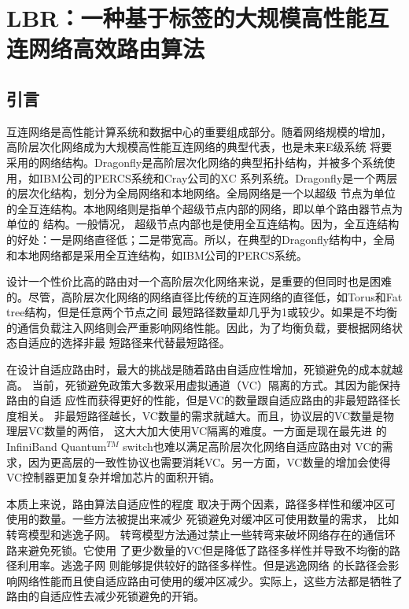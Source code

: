 \chapter{LBR：一种基于标签的大规模高性能互连网络高效路由算法}

\section{引言}

互连网络是高性能计算系统和数据中心的重要组成部分。随着网络规模的增加，
高阶层次化网络成为大规模高性能互连网络的典型代表，也是未来E级系统
将要采用的网络结构。Dragonfly是高阶层次化网络的典型拓扑结构，并被多个系统使用，如IBM公司的PERCS系统和Cray公司的XC 系列系统。Dragonfly是一个两层的层次化结构，划分为全局网络和本地网络。全局网络是一个以超级
节点为单位的全互连结构。本地网络则是指单个超级节点内部的网络，即以单个路由器节点为单位的
结构。一般情况，
超级节点内部也是使用全互连结构。因为，全互连结构的好处：一是网络直径低；二是带宽高。所以，在典型的Dragonfly结构中，全局
和本地网络都是采用全互连结构，如IBM公司的PERCS系统。

设计一个性价比高的路由对一个高阶层次化网络来说，是重要的但同时也是困难
的。尽管，高阶层次化网络的网络直径比传统的互连网络的直径低，如Torus和Fat tree结构，但是任意两个节点之间
最短路径数量却几乎为1或较少。如果是不均衡的通信负载注入网络则会严重影响网络性能。因此，为了均衡负载，要根据网络状态自适应的选择非最
短路径来代替最短路径。

在设计自适应路由时，最大的挑战是随着路由自适应性增加，死锁避免的成本就越高。
当前，死锁避免政策大多数采用虚拟通道（VC）隔离的方式。其因为能保持路由的自适
应性而获得更好的性能，但是VC的数量跟自适应路由的非最短路径长度相关。
非最短路径越长，VC数量的需求就越大。而且，协议层的VC数量是物理层VC数量的两倍，
这大大加大使用VC隔离的难度。一方面是现在最先进
的InfiniBand Quantum$^{TM}$ switch也难以满足高阶层次化网络自适应路由对
VC的需求，因为更高层的一致性协议也需要消耗VC。另一方面，VC数量的增加会使得
VC控制器更加复杂并增加芯片的面积开销。

本质上来说，路由算法自适应性的程度
取决于两个因素，路径多样性和缓冲区可使用的数量。一些方法被提出来减少
死锁避免对缓冲区可使用数量的需求，
比如转弯模型和逃逸子网。
转弯模型方法通过禁止一些转弯来破坏网络存在的通信环路来避免死锁。它使用
了更少数量的VC但是降低了路径多样性并导致不均衡的路径利用率。逃逸子网
则能够提供较好的路径多样性。但是逃逸网络
的长路径会影响网络性能而且使自适应路由可使用的缓冲区减少。实际上，这些方法都是牺牲了路由的自适应性去减少死锁避免的开销。

